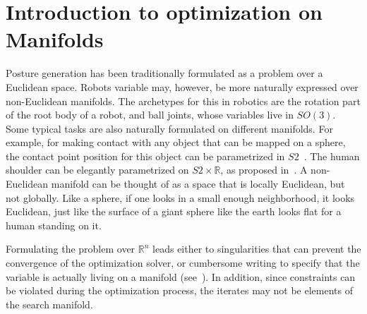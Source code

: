 
\section{Introduction to optimization on Manifolds}
\label{sec:introduction_to_optimization_on_manifolds}

Posture generation has been traditionally formulated as a problem over a Euclidean space.
Robots variable may, however, be more naturally expressed over non-Euclidean manifolds.
The archetypes for this in robotics are the rotation part of the root body of a robot, and ball joints, whose variables live in $SO(3)$.
Some typical tasks are also naturally formulated on different manifolds.
For example, for making contact with any object that can be mapped on a sphere, the contact point position for this object can be parametrized in $S2$~\cite{escande:icra:2016}.
The human shoulder can be elegantly parametrized on $S2\times\mathbb{R}$, as proposed in~\cite{baerlocher}.
A non-Euclidean manifold can be thought of as a space that is locally Euclidean, but not globally.
Like a sphere, if one looks in a small enough neighborhood, it looks Euclidean, just like the surface of a giant sphere like the earth looks flat for a human standing on it.

Formulating the problem over $\mathbb{R}^n$ leads either to singularities that can prevent the convergence of the optimization solver, or cumbersome writing to specify that the variable is actually living on a manifold (see~\cite{bouyarmane:humanoids:2012}).
In addition, since constraints can be violated during the optimization process, the iterates may not be elements of the search manifold.


